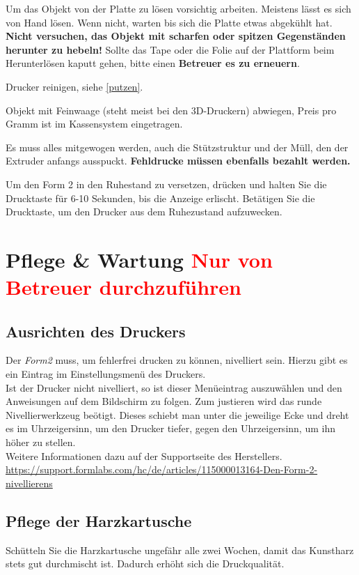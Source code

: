 \documentclass{\basedir/fablab-document}
\begin{document}
	Um das Objekt von der Platte zu lösen vorsichtig arbeiten. Meistens lässt es sich von Hand lösen. Wenn nicht,
	warten bis sich die Platte etwas abgekühlt hat. \textbf{Nicht versuchen, das Objekt mit scharfen oder spitzen Gegenständen herunter zu hebeln!}
	Sollte das Tape oder die Folie auf der Plattform beim Herunterlösen kaputt gehen, bitte einen \textbf{Betreuer es zu erneuern}.
	
	Drucker reinigen, siehe \ref{putzen}.
	
	Objekt mit Feinwaage (steht meist bei den 3D-Druckern) abwiegen, Preis pro Gramm ist im Kassensystem eingetragen.
	
	Es muss alles mitgewogen werden, auch die Stützstruktur und der Müll, den der Extruder anfangs ausspuckt. \textbf{Fehldrucke müssen ebenfalls bezahlt werden.}
	
	 Um den Form 2 in den Ruhestand zu versetzen, drücken und halten Sie die Drucktaste für 6-10 Sekunden, bis die Anzeige erlischt. Betätigen Sie die Drucktaste, um den Drucker aus dem Ruhezustand aufzuwecken.
	\pagebreak
	

	\section{Pflege \& Wartung \textcolor{red}{Nur von Betreuer durchzuführen}}
	
	\subsection{Ausrichten des Druckers}
	Der \textit{Form2} muss, um fehlerfrei drucken zu können, nivelliert sein. Hierzu gibt es ein Eintrag im Einstellungsmenü des Druckers.\\
	Ist der Drucker nicht nivelliert, so ist dieser Menüeintrag auszuwählen und den Anweisungen auf dem Bildschirm zu folgen. Zum justieren wird das runde Nivellierwerkzeug beötigt. Dieses schiebt man unter die jeweilige Ecke und dreht es im Uhrzeigersinn, um den Drucker tiefer, gegen den Uhrzeigersinn, um ihn höher zu stellen.\\
	Weitere Informationen dazu auf der Supportseite des Herstellers.	\\
	 \url{https://support.formlabs.com/hc/de/articles/115000013164-Den-Form-2-nivellierens}
	 
	 \subsection{Pflege der Harzkartusche}
	 Schütteln Sie die Harzkartusche ungefähr alle zwei Wochen, damit das Kunstharz stets gut durchmischt ist. Dadurch erhöht sich die Druckqualität.
	
\end{document}
